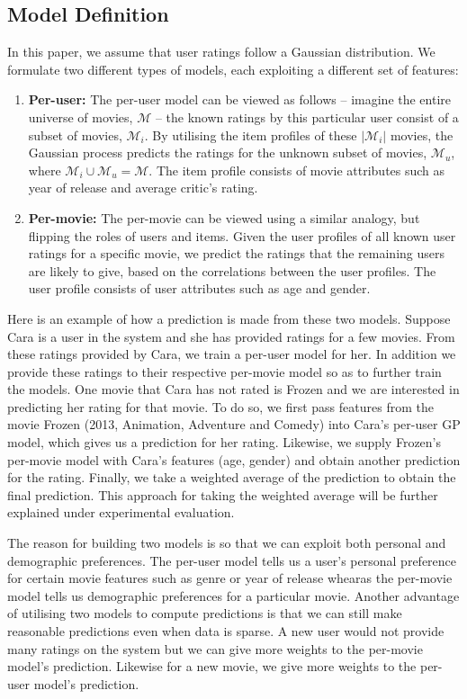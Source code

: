 \documentclass[letterpaper]{article}
\begin{document}
\subsection{Model Definition}
In this paper, we assume that user ratings follow a Gaussian distribution. We formulate two different types of models, each exploiting a different set of features:

\begin{enumerate}
	\item \textbf{Per-user:} The per-user model can be viewed as follows -- imagine the entire universe of movies, $\mathcal{M}$ -- the known ratings by this particular user consist of a subset of movies, $\mathcal{M}_i$. By utilising the item profiles of these $\vert \mathcal{M}_i \vert$ movies, the Gaussian process predicts the ratings for the unknown subset of movies, $\mathcal{M}_u$, where $\mathcal{M}_i \cup \mathcal{M}_u = \mathcal{M}$. The item profile consists of movie attributes such as year of release and average critic's rating.
	\item \textbf{Per-movie:} The per-movie can be viewed using a similar analogy, but flipping the roles of users and items. Given the user profiles of all known user ratings for a specific movie, we predict the ratings that the remaining users are likely to give, based on the correlations between the user profiles. The user profile consists of user attributes such as age and gender.
\end{enumerate}

Here is an example of how a prediction is made from these two models.
Suppose Cara is a user in the system and she has provided ratings for a few movies. 
From these ratings provided by Cara, we train a per-user model for her.
In addition we provide these ratings to their respective per-movie model so as to further train the models.
One movie that Cara has not rated is Frozen and we are interested in predicting her rating for that movie.
To do so, we first pass features from the movie Frozen (2013, Animation, Adventure and Comedy) into Cara's per-user GP model, which gives us a prediction for her rating.
Likewise, we supply Frozen's per-movie model with Cara's features (age, gender) and obtain another prediction for the rating.
Finally, we take a weighted average of the prediction to obtain the final prediction. 
This approach for taking the weighted average will be further explained under experimental evaluation.

The reason for building two models is so that we can exploit both personal and demographic preferences. The per-user model tells us a user's personal preference for certain movie features such as genre or year of release whearas the per-movie model tells us demographic preferences for a particular movie. Another advantage of utilising two models to compute predictions is that we can still make reasonable predictions even when data is sparse. A new user would not provide many ratings on the system but we can give more weights to the per-movie model's prediction. Likewise for a new movie, we give more weights to the per-user model's prediction.
\end{document}
